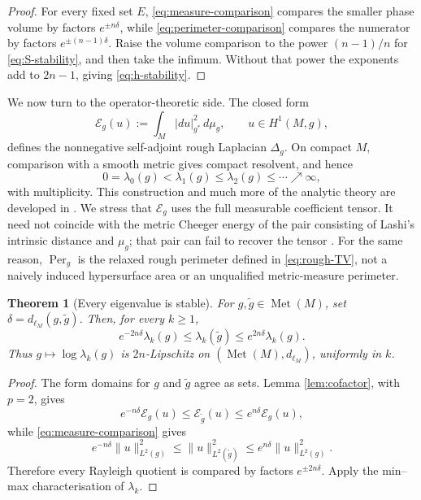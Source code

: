 \documentclass[11pt]{amsart}
\newtheorem{theorem}{Theorem}[section]
\theoremstyle{definition}
\theoremstyle{remark}
\newcommand{\Met}{\operatorname{Met}}
\newcommand{\dMet}{d_{\ell_M}}
\newcommand{\Per}{\operatorname{Per}}
\newcommand{\dmu}[1]{\,d\mu_{#1}}
\newcommand{\cE}{\mathcal E}
\begin{document}
\begin{proof}
For every fixed set $E$, \eqref{eq:measure-comparison} compares the smaller
phase volume by factors $e^{\pm n\delta}$, while
\eqref{eq:perimeter-comparison} compares the numerator by factors
$e^{\pm(n-1)\delta}$.  Raise the volume comparison to the power
$(n-1)/n$ for \eqref{eq:S-stability}, and then take the infimum.  Without
that power the exponents add to $2n-1$, giving \eqref{eq:h-stability}.
\end{proof}

We now turn to the operator-theoretic side.  The closed form
\begin{equation}\label{eq:Dirichlet-form}
 \cE_g(u):=\int_M |du|_{g^*}^2\dmu g,
 \qquad u\in H^1(M,g),
\end{equation}
defines the nonnegative self-adjoint rough Laplacian $\Delta_g$.  On compact
$M$, comparison with a smooth metric gives compact resolvent, and hence
\[
 0=\lambda_0(g)<\lambda_1(g)\leq\lambda_2(g)\leq\cdots\nearrow\infty,
\]
with multiplicity.  This construction and much more of the analytic theory
are developed in
\cite{Bandara2016,BandaraBryan2020,BandaraNursultanovRowlett2021}.
We stress that $\cE_g$ uses the full measurable coefficient tensor.  It need
not coincide with the metric Cheeger energy of the pair consisting of Lashi's
intrinsic distance and $\mu_g$; that pair can fail to recover the tensor
\cite{BandaraHassan2025}.  For the same reason, $\Per_g$ is the relaxed rough
perimeter defined in \eqref{eq:rough-TV}, not a naively induced hypersurface
area or an unqualified metric-measure perimeter.

\begin{theorem}[Every eigenvalue is stable]
\label{thm:eigenvalue-stability}
For $g,\widetilde g\in\Met(M)$, set
$\delta=\dMet(g,\widetilde g)$.  Then, for every $k\geq1$,
\begin{equation}\label{eq:eigenvalue-comparison}
 e^{-2n\delta}\lambda_k(g)
 \leq\lambda_k(\widetilde g)
 \leq e^{2n\delta}\lambda_k(g).
\end{equation}
Thus $g\mapsto\log\lambda_k(g)$ is $2n$-Lipschitz on
$(\Met(M),\dMet)$, uniformly in $k$.
\end{theorem}

\begin{proof}
The form domains for $g$ and $\widetilde g$ agree as sets.  Lemma
\ref{lem:cofactor}, with $p=2$, gives
\[
 e^{-n\delta}\cE_g(u)\leq\cE_{\widetilde g}(u)
 \leq e^{n\delta}\cE_g(u),
\]
while \eqref{eq:measure-comparison} gives
\[
 e^{-n\delta}\|u\|_{L^2(g)}^2
 \leq\|u\|_{L^2(\widetilde g)}^2
 \leq e^{n\delta}\|u\|_{L^2(g)}^2.
\]
Therefore every Rayleigh quotient is compared by factors
$e^{\pm2n\delta}$.  Apply the min--max characterisation of
$\lambda_k$.
\end{proof}
\end{document}
